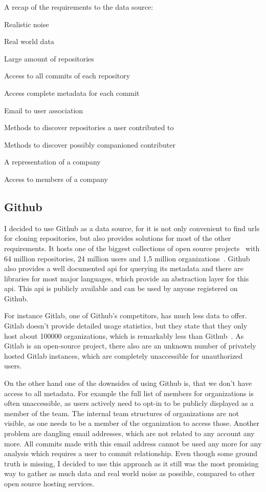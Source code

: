 \begin{itemlist}{A recap of the requirements to the data source:}
    \item Realistic noise
    \item Real world data
    \item Large amount of repositories
    \item Access to all commits of each repository
    \item Access complete metadata for each commit
    \item Email to user association
    \item Methods to discover repositories a user contributed to
    \item Methods to discover possibly companioned contributer
    \item A representation of a company
    \item Access to members of a company
\end{itemlist}


\subsection{Github}\label{github}
I decided to use Github as a data source, for it is not only convenient to find \acp{url} for cloning repositories, but also provides solutions for most of the other requirements.
It hosts one of the biggest collections of open source projects~\cite{techreport:how-github-conquered} with 64 million repositories, 24 million users and 1,5 million organizations~\cite{article:github-statistics}.
Github also provides a well documented \ac{api} for querying its metadata and there are libraries for most major languages, which provide an abstraction layer for this \ac{api}.
This \ac{api} is publicly available and can be used by anyone registered on Github.

For instance Gitlab, one of Github's competitors, has much less data to offer.
Gitlab doesn't provide detailed usage statistics, but they state that they only host about 100000 organizations, which is remarkably less than Github~\cite{article:gitlab-help}.
As Gitlab is an open-source project, there also are an unknown number of privately hosted Gitlab instances, which are completely unaccessible for unauthorized users.

On the other hand one of the downsides of using Github is, that we don't have access to all metadata.
For example the full list of members for organizations is often unaccessible, as users actively need to opt-in to be publicly displayed as a member of the team.
The internal team structures of organizations are not visible, as one needs to be a member of the organization to access those.
Another problem are dangling email addresses, which are not related to any account any more.
All commits made with this email address cannot be used any more for any analysis which requires a user to commit relationship.
Even though some ground truth is missing, I decided to use this approach as it still was the most promising way to gather as much data and real world noise as possible, compared to other open source hosting services.

